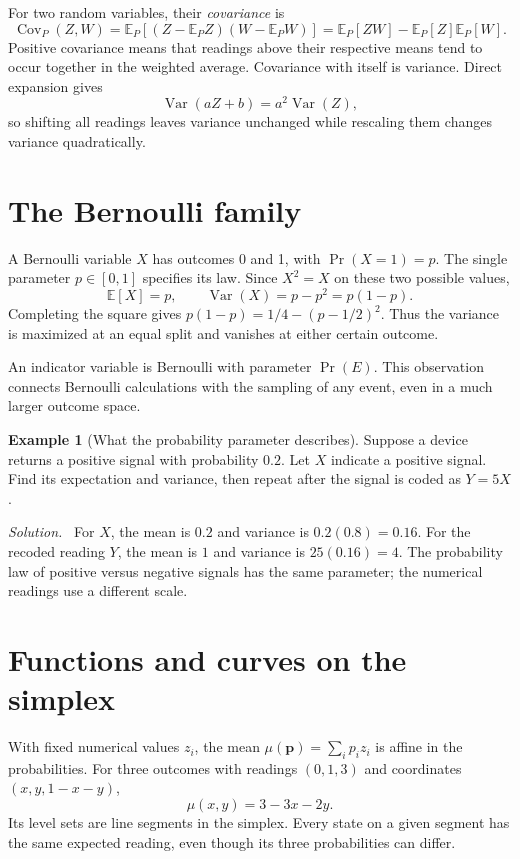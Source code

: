 \documentclass[11pt,oneside,openany]{book}
\theoremstyle{definition}
\newtheorem{example}{Example}[chapter]
\theoremstyle{remark}
\newenvironment{solution}{\par\smallskip\noindent\textit{Solution.}\ }{\par\smallskip}
\newcommand{\E}{\mathbb{E}}
\newcommand{\Var}{\operatorname{Var}}
\newcommand{\Cov}{\operatorname{Cov}}
\newcommand{\p}{\mathbf{p}}
\numberwithin{equation}{chapter}
\begin{document}
For two random variables, their \emph{covariance} is
\begin{equation}\label{eq:covariance}
\Cov_P(Z,W)=\E_P[(Z-\E_PZ)(W-\E_PW)]
=\E_P[ZW]-\E_P[Z]\E_P[W].
\end{equation}
Positive covariance means that readings above their respective means tend to occur together in the weighted average. Covariance with itself is variance. Direct expansion gives
\[
\Var(aZ+b)=a^2\Var(Z),
\]
so shifting all readings leaves variance unchanged while rescaling them changes variance quadratically.

\section{The Bernoulli family}
A Bernoulli variable $X$ has outcomes 0 and 1, with $\Pr(X=1)=p$. The single parameter $p\in[0,1]$ specifies its law. Since $X^2=X$ on these two possible values,
\begin{equation}\label{eq:bernoullimoments}
\E[X]=p,\qquad \Var(X)=p-p^2=p(1-p).
\end{equation}
Completing the square gives $p(1-p)=1/4-(p-1/2)^2$. Thus the variance is maximized at an equal split and vanishes at either certain outcome.

An indicator variable is Bernoulli with parameter $\Pr(E)$. This observation connects Bernoulli calculations with the sampling of any event, even in a much larger outcome space.

\begin{example}[What the probability parameter describes]
Suppose a device returns a positive signal with probability $0.2$. Let $X$ indicate a positive signal. Find its expectation and variance, then repeat after the signal is coded as $Y=5X$.
\begin{solution}
For $X$, the mean is $0.2$ and variance is $0.2(0.8)=0.16$. For the recoded reading $Y$, the mean is $1$ and variance is $25(0.16)=4$. The probability law of positive versus negative signals has the same parameter; the numerical readings use a different scale.
\end{solution}
\end{example}

\section{Functions and curves on the simplex}
With fixed numerical values $z_i$, the mean $\mu(\p)=\sum_i p_i z_i$ is affine in the probabilities. For three outcomes with readings $(0,1,3)$ and coordinates $(x,y,1-x-y)$,
\[
\mu(x,y)=3-3x-2y.
\]
Its level sets are line segments in the simplex. Every state on a given segment has the same expected reading, even though its three probabilities can differ.
\end{document}
